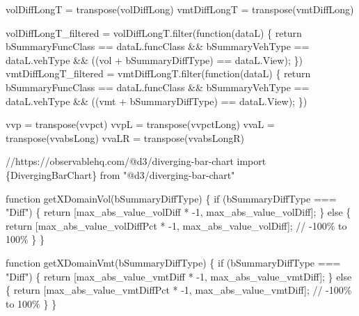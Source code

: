\documentclass[
  letterpaper,
  DIV=11,
  numbers=noendperiod]{scrreprt}
\newenvironment{Shaded}{\begin{snugshade}}{\end{snugshade}}
\newcommand{\NormalTok}[1]{\textcolor[rgb]{0.00,0.23,0.31}{#1}}
\begin{document}
\begin{Shaded}
\begin{Highlighting}[]

\NormalTok{volDiffLongT = transpose(volDiffLong)}
\NormalTok{vmtDiffLongT = transpose(vmtDiffLong)}

\NormalTok{volDiffLongT\_filtered = volDiffLongT.filter(function(dataL) \{}
\NormalTok{    return bSummaryFuncClass == dataL.funcClass \&\&}
\NormalTok{           bSummaryVehType == dataL.vehType \&\&}
\NormalTok{           ((\textquotesingle{}vol\textquotesingle{} + bSummaryDiffType) == dataL.View);}
\NormalTok{\})}
\NormalTok{vmtDiffLongT\_filtered = vmtDiffLongT.filter(function(dataL) \{}
\NormalTok{    return bSummaryFuncClass == dataL.funcClass \&\&}
\NormalTok{           bSummaryVehType == dataL.vehType \&\&}
\NormalTok{           ((\textquotesingle{}vmt\textquotesingle{} + bSummaryDiffType) == dataL.View);}
\NormalTok{\})}

\NormalTok{vvp = transpose(vvpct)}
\NormalTok{vvpL = transpose(vvpctLong)}
\NormalTok{vvaL = transpose(vvabsLong)}
\NormalTok{vvaLR = transpose(vvabsLongR)}
\end{Highlighting}
\end{Shaded}

\begin{Shaded}
\begin{Highlighting}[]
\NormalTok{//https://observablehq.com/@d3/diverging{-}bar{-}chart}
\NormalTok{import \{DivergingBarChart\} from "@d3/diverging{-}bar{-}chart"}

\NormalTok{function getXDomainVol(bSummaryDiffType) \{}
\NormalTok{    if (bSummaryDiffType === "Diff") \{}
\NormalTok{        return [max\_abs\_value\_volDiff * {-}1, max\_abs\_value\_volDiff];}
\NormalTok{    \} else \{}
\NormalTok{        return [max\_abs\_value\_volDiffPct * {-}1, max\_abs\_value\_volDiff]; // {-}100\% to 100\%}
\NormalTok{    \}}
\NormalTok{\}}

\NormalTok{function getXDomainVmt(bSummaryDiffType) \{}
\NormalTok{    if (bSummaryDiffType === "Diff") \{}
\NormalTok{        return [max\_abs\_value\_vmtDiff * {-}1, max\_abs\_value\_vmtDiff];}
\NormalTok{    \} else \{}
\NormalTok{        return [max\_abs\_value\_vmtDiffPct * {-}1, max\_abs\_value\_vmtDiff]; // {-}100\% to 100\%}
\NormalTok{    \}}
\NormalTok{\}}
\end{Highlighting}
\end{Shaded}
\end{document}
